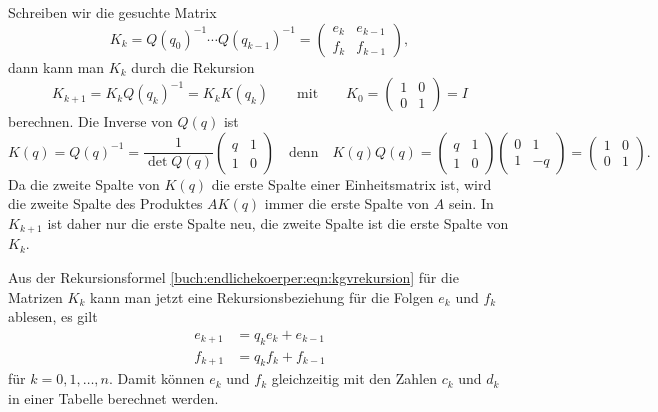 Schreiben wir die gesuchte Matrix 
\[
K_k
=
Q(q_0)^{-1}\cdots Q(q_{k-1})^{-1}
=
\begin{pmatrix}
e_k & e_{k-1}\\
f_k & f_{k-1}
\end{pmatrix},
\]
dann kann man $K_k$ durch die Rekursion
\begin{equation}
K_{k+1}
=
K_{k} Q(q_k)^{-1} 
=
K_k K(q_k)
\qquad\text{mit}\qquad
K_0 = \begin{pmatrix}1&0\\0&1\end{pmatrix} = I
\label{buch:endlichekoerper:eqn:kgvrekursion}
\end{equation}
berechnen.
Die Inverse von $Q(q)$ ist
\[
K(q)
=
Q(q)^{-1}
=
\frac{1}{\det Q(q)}
\begin{pmatrix}
q&1\\
1&0
\end{pmatrix}
\quad\text{denn}\quad
K(q)Q(q)
=
\begin{pmatrix}
q&1\\
1&0
\end{pmatrix}
\begin{pmatrix}
0&1\\
1&-q
\end{pmatrix}
=
\begin{pmatrix}
1&0\\
0&1
\end{pmatrix}.
\]
Da die zweite Spalte von $K(q)$ die erste Spalte einer Einheitsmatrix
ist, wird die zweite Spalte des Produktes $AK(q)$ immer die erste Spalte
von $A$ sein.
In $K_{k+1}$ ist daher nur die erste Spalte neu, die zweite Spalte ist
die erste Spalte von $K_k$.

Aus der Rekursionsformel \eqref{buch:endlichekoerper:eqn:kgvrekursion}
für die Matrizen $K_k$ kann man jetzt eine Rekursionsbeziehung
für die Folgen $e_k$ und $f_k$ ablesen, es gilt
\begin{align*}
e_{k+1} &= q_ke_k + e_{k-1} \\
f_{k+1} &= q_kf_k + f_{k-1}
\end{align*}
für $k=0,1,\dots ,n$.
Damit können $e_k$ und $f_k$ gleichzeitig mit den Zahlen $c_k$ und $d_k$
in einer Tabelle berechnet werden.

